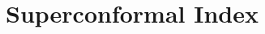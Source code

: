 \documentclass[main.tex]{subfiles}
\begin{document}
 


\section{Superconformal Index}
\end{document}
